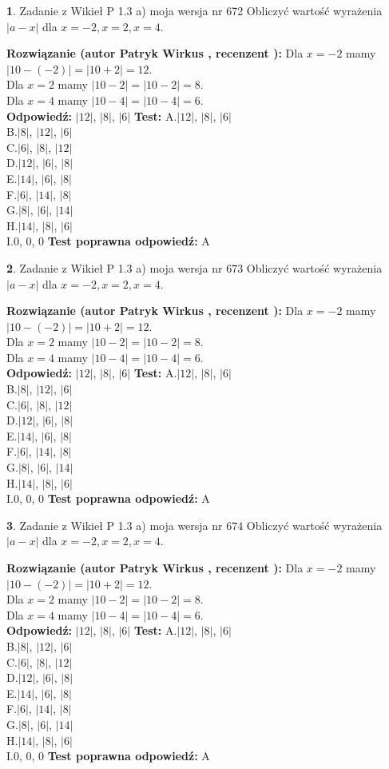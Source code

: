 \documentclass[12pt, a4paper]{article}
\theoremstyle{definition} %
\newtheorem{zad}{}
\newcommand{\zadStart}[1]{\begin{zad}#1\newline}
\newcommand{\zadStop}{\end{zad}}
\newcommand{\rozwStart}[2]{\noindent \textbf{Rozwiązanie (autor #1 , recenzent #2): }\newline}
\newcommand{\rozwStop}{\newline}
\newcommand{\odpStart}{\noindent \textbf{Odpowiedź:}\newline}
\newcommand{\odpStop}{\newline}
\newcommand{\testStart}{\noindent \textbf{Test:}\newline}
\newcommand{\testStop}{\newline}
\newcommand{\kluczStart}{\noindent \textbf{Test poprawna odpowiedź:}\newline}
\newcommand{\kluczStop}{\newline}
\begin{document}
\zadStart{Zadanie z Wikieł P 1.3 a) moja wersja nr 672}
Obliczyć wartość wyrażenia $|a - x|$ dla $x=-2,x=2,x=4$.
\zadStop
\rozwStart{Patryk Wirkus}{}
Dla $x = -2$ mamy $|10 - (-2)| = |10 + 2| = 12$.\\
Dla $x = 2$ mamy $|10 - 2| = |10 - 2| = 8$.\\
Dla $x = 4$ mamy $|10 - 4| = |10 - 4| = 6$.\\
\rozwStop
\odpStart
$|12|$, $|8|$, $|6|$
\odpStop
\testStart
A.$|12|$, $|8|$, $|6|$\\
B.$|8|$, $|12|$, $|6|$\\
C.$|6|$, $|8|$, $|12|$\\
D.$|12|$, $|6|$, $|8|$\\
E.$|14|$, $|6|$, $|8|$\\
F.$|6|$, $|14|$, $|8|$\\
G.$|8|$, $|6|$, $|14|$\\
H.$|14|$, $|8|$, $|6|$\\
I.$0$, $0$, $0$
\testStop
\kluczStart
A
\kluczStop



\zadStart{Zadanie z Wikieł P 1.3 a) moja wersja nr 673}
Obliczyć wartość wyrażenia $|a - x|$ dla $x=-2,x=2,x=4$.
\zadStop
\rozwStart{Patryk Wirkus}{}
Dla $x = -2$ mamy $|10 - (-2)| = |10 + 2| = 12$.\\
Dla $x = 2$ mamy $|10 - 2| = |10 - 2| = 8$.\\
Dla $x = 4$ mamy $|10 - 4| = |10 - 4| = 6$.\\
\rozwStop
\odpStart
$|12|$, $|8|$, $|6|$
\odpStop
\testStart
A.$|12|$, $|8|$, $|6|$\\
B.$|8|$, $|12|$, $|6|$\\
C.$|6|$, $|8|$, $|12|$\\
D.$|12|$, $|6|$, $|8|$\\
E.$|14|$, $|6|$, $|8|$\\
F.$|6|$, $|14|$, $|8|$\\
G.$|8|$, $|6|$, $|14|$\\
H.$|14|$, $|8|$, $|6|$\\
I.$0$, $0$, $0$
\testStop
\kluczStart
A
\kluczStop



\zadStart{Zadanie z Wikieł P 1.3 a) moja wersja nr 674}
Obliczyć wartość wyrażenia $|a - x|$ dla $x=-2,x=2,x=4$.
\zadStop
\rozwStart{Patryk Wirkus}{}
Dla $x = -2$ mamy $|10 - (-2)| = |10 + 2| = 12$.\\
Dla $x = 2$ mamy $|10 - 2| = |10 - 2| = 8$.\\
Dla $x = 4$ mamy $|10 - 4| = |10 - 4| = 6$.\\
\rozwStop
\odpStart
$|12|$, $|8|$, $|6|$
\odpStop
\testStart
A.$|12|$, $|8|$, $|6|$\\
B.$|8|$, $|12|$, $|6|$\\
C.$|6|$, $|8|$, $|12|$\\
D.$|12|$, $|6|$, $|8|$\\
E.$|14|$, $|6|$, $|8|$\\
F.$|6|$, $|14|$, $|8|$\\
G.$|8|$, $|6|$, $|14|$\\
H.$|14|$, $|8|$, $|6|$\\
I.$0$, $0$, $0$
\testStop
\kluczStart
A
\kluczStop
\end{document}
